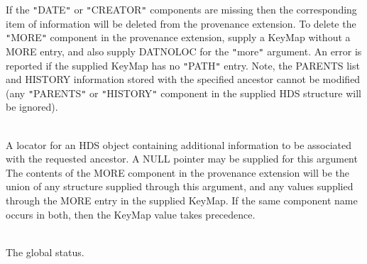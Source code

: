 \documentclass[twoside,11pt]{article}
\renewcommand{\_}{\texttt{\symbol{95}}}
\newcommand{\sstsubsection}[1]{ \item[{#1}] \mbox{} \\}
\newcommand{\sstsubsection}[1]{\item[{#1}]}
\begin{document}
{{{{         }
         If the {\tt "}DATE{\tt "} or {\tt "}CREATOR{\tt "} components are missing then the
         corresponding item of information will be deleted from the
         provenance extension. To delete the {\tt "}MORE{\tt "} component in the
         provenance extension, supply a KeyMap without a MORE entry, and
         also supply DAT\_NOLOC for the {\tt "}more{\tt "} argument. An error is
         reported if the supplied KeyMap has no {\tt "}PATH{\tt "} entry. Note, the
         PARENTS list and HISTORY information stored with the specified
         ancestor cannot be modified (any {\tt "}PARENTS{\tt "} or {\tt "}HISTORY{\tt "}
         component in the supplied HDS structure will be ignored).
      }
      \sstsubsection{
         more
      }{
         A locator for an HDS object containing additional information to
         be associated with the requested ancestor. A NULL pointer may be
         supplied for this argument The contents of the MORE component
         in the provenance extension will be the union of any structure
         supplied through this argument, and any values supplied through
         the MORE entry in the supplied KeyMap. If the same component
         name occurs in both, then the KeyMap value takes precedence.
      }
      \sstsubsection{
         status
      }{
         The global status.
      }
   }
}
\end{document}
